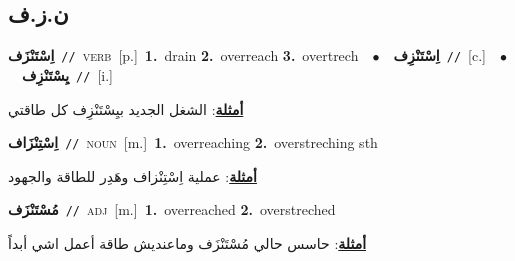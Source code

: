 \documentclass[10pt,a4paper,twoside]{article} %
\begin{document}
\begin{multicols}{2}
\vspace{-3mm}
\subsection*{\color{blue}\foreignlanguage{arabic}{ن.ز.ف}\color{blue}{}} 

{\setlength\topsep{0pt}\textbf{\foreignlanguage{arabic}{اِسْتَنْزَف}}\ {\color{gray}\texttt{//}\color{black}}\ \textsc{verb}\ [p.]\ \textbf{1.}~drain  \textbf{2.}~overreach  \textbf{3.}~overtrech\ \ $\bullet$\ \ \setlength\topsep{0pt}\textbf{\foreignlanguage{arabic}{اِسْتَنْزِف}}\ {\color{gray}\texttt{//}\color{black}}\ [c.]\ \ $\bullet$\ \ \setlength\topsep{0pt}\textbf{\foreignlanguage{arabic}{يِسْتَنْزِف}}\ {\color{gray}\texttt{//}\color{black}}\ [i.]\  \begin{flushright}\color{gray}\foreignlanguage{arabic}{\textbf{\underline{\foreignlanguage{arabic}{أمثلة}}}: الشغل الجديد بيِسْتَنْزِف كل طاقتي}\end{flushright}\color{black}} \vspace{2mm}

{\setlength\topsep{0pt}\textbf{\foreignlanguage{arabic}{اِسْتِنْزَاف}}\ {\color{gray}\texttt{//}\color{black}}\ \textsc{noun}\ [m.]\ \textbf{1.}~overreaching  \textbf{2.}~overstreching sth\  \begin{flushright}\color{gray}\foreignlanguage{arabic}{\textbf{\underline{\foreignlanguage{arabic}{أمثلة}}}: عملية اِسْتِنْزاف وهَدِر للطاقة والجهود}\end{flushright}\color{black}} \vspace{2mm}

{\setlength\topsep{0pt}\textbf{\foreignlanguage{arabic}{مُسْتَنْزَف}}\ {\color{gray}\texttt{//}\color{black}}\ \textsc{adj}\ [m.]\ \textbf{1.}~overreached  \textbf{2.}~overstreched\  \begin{flushright}\color{gray}\foreignlanguage{arabic}{\textbf{\underline{\foreignlanguage{arabic}{أمثلة}}}: حاسس حالي مُسْتَنْزَف وماعنديش طاقة أعمل اشي أبداً}\end{flushright}\color{black}} \vspace{2mm}


\end{multicols}
\end{document}

